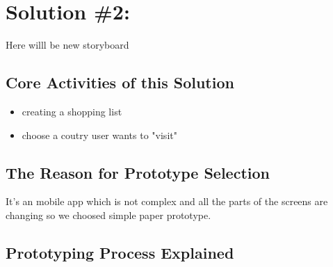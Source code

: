 \section{Solution \#2:}

Here willl be new storyboard

\subsection{Core Activities of this Solution}

\begin{itemize}
	\item creating a shopping list
	
	
	\item choose a coutry user wants to "visit"
\end{itemize}

\subsection{The Reason for Prototype Selection}

It's an mobile app which is not complex and all the parts of the screens are changing so we choosed simple paper prototype.

\subsection{Prototyping Process Explained}

